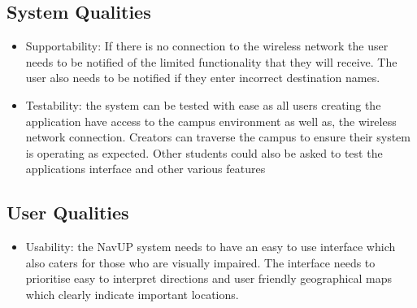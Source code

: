 \documentclass[11pt]{article}
\begin{document}
\subsection{System Qualities}

\begin{itemize}

\item Supportability: If there is no connection to the wireless network the user needs to be notified of the limited functionality that they will receive. The user also needs to be notified if they enter incorrect destination names. 	
\item Testability: the system can be tested with ease as all users creating the application have access to the campus environment as well as, the wireless network connection. Creators can traverse the campus to ensure their system is operating as expected. Other students could also be asked to test the applications interface and other various features  

\end{itemize}

\subsection{User Qualities}

\begin{itemize}

\item Usability: the NavUP system needs to have an easy to use interface which also caters for those who are visually impaired. The interface needs to prioritise easy to interpret directions and user friendly geographical maps which clearly indicate important locations.  	

\end{itemize}
\end{document}
